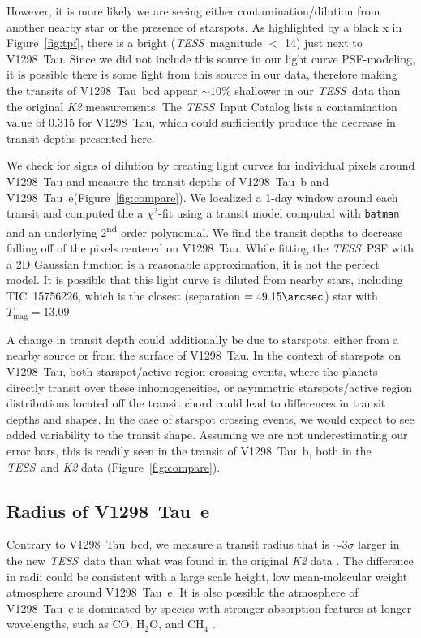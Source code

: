 \documentclass[linenumbers,twocolumn]{aastex631}
\newcommand{\tess}{\textit{TESS}}
\newcommand{\sname}{V1298~Tau\xspace}
\newcommand{\planetb}{V1298~Tau~b\xspace}
\newcommand{\planete}{V1298~Tau~e\xspace}
\newcommand{\planetknown}{V1298~Tau~bcd\xspace}
\begin{document}
However, it is more likely we are seeing either contamination/dilution from another nearby star or the presence of starspots. As highlighted by a black x in Figure~\ref{fig:tpf}, there is a bright (\tess\ magnitude $<$ 14) just next to \sname. Since we did not include this source in our light curve PSF-modeling, it is possible there is some light from this source in our data, therefore making the transits of \planetknown appear $\sim 10$\% shallower in our \tess\ data than the original \textit{K2} measurements. The \tess\ Input Catalog \citep{stassun18} lists a contamination value of 0.315 for \sname, which could sufficiently produce the decrease in transit depths presented here. 

We check for signs of dilution by creating light curves for individual pixels around \sname and measure the transit depths of \planetb and \planete (Figure~\ref{fig:compare}). We localized a 1-day window around each transit and computed the a $\chi^2$-fit using a transit model computed with \texttt{batman} \citep{Kreidberg15} and an underlying 2\textsuperscript{nd} order polynomial. We find the transit depths to decrease falling off of the pixels centered on \sname. While fitting the \tess\ PSF with a 2D Gaussian function is a reasonable approximation, it is not the perfect model. It is possible that this light curve is diluted from nearby stars, including TIC~15756226, which is the closest (separation $= 49.15\arcsec$) star with $T_\textrm{mag} = 13.09$.

A change in transit depth could additionally be due to starspots, either from a nearby source or from the surface of \sname. In the context of starspots on \sname, both starspot/active region crossing events, where the planets directly transit over these inhomogeneities, or asymmetric starspots/active region distributions located off the transit chord could lead to differences in transit depths and shapes. In the case of starspot crossing events, we would expect to see added variability to the transit shape. Assuming we are not underestimating our error bars, this is readily seen in the transit of \planetb, both in the \tess\ and \textit{K2} data (Figure~\ref{fig:compare}). 


\subsection{Radius of \planete}

Contrary to \planetknown, we measure a transit radius that is $\sim 3\sigma$ larger in the new \tess\ data than what was found in the original \textit{K2} data \citep{David2019a}. The difference in radii could be consistent with a large scale height, low mean-molecular weight atmosphere around \planete \citep{deMooij12}. It is also possible the atmosphere of \planete is dominated by species with stronger absorption features at longer wavelengths, such as CO, H$_2$O, and CH$_4$ \citep{carter09}. 
\end{document}
